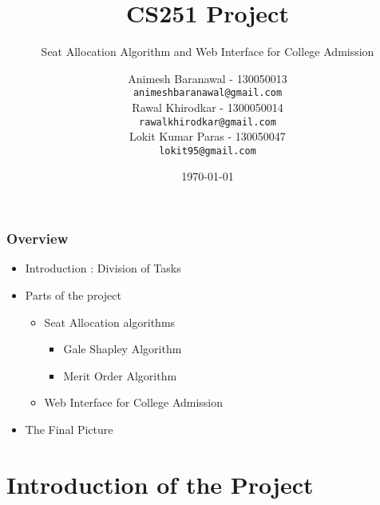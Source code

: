\documentclass{beamer}
\title{CS251 Project} %
\subtitle{ Seat Allocation Algorithm and Web Interface for College Admission }
\author{
	Animesh Baranawal - 130050013 \\
	\texttt {animeshbaranawal@gmail.com} \\
	Rawal Khirodkar - 1300050014 \\
	\texttt {rawalkhirodkar@gmail.com} \\
	Lokit Kumar Paras - 130050047 \\
	\texttt {lokit95@gmail.com} 
}
\institute[IITB] %
{
Indian Institute of Technology, Bombay \\ %
\medskip
\textit{http://www.cse.iitb.ac.in/~animaxburnol/group.html} %
}
\date{\today} %
\begin{document}
\begin{frame}
\titlepage %
\end{frame}

\begin{frame}
\frametitle{Overview} %
\begin{itemize}
  \item Introduction : Division of Tasks\pause
  \item Parts of the project \pause
    \begin{itemize}
      \item Seat Allocation algorithms \pause
        \begin{itemize}
        \item Gale Shapley Algorithm 
        \item Merit Order Algorithm \pause
		\end{itemize}  
      \item Web Interface for College Admission \pause
    \end{itemize}
  \item The Final Picture 
\end{itemize}
\end{frame}


\section{Introduction of the Project} %
\end{document}
